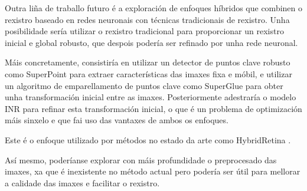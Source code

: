 Outra liña de traballo futuro é a exploración de enfoques híbridos que combinen o rexistro baseado en redes neuronais con técnicas tradicionais de rexistro.
Unha posibilidade sería utilizar o rexistro tradicional para proporcionar un rexistro inicial e global robusto, que despois podería ser refinado por unha rede neuronal.

Máis concretamente, consistiría en utilizar un detector de puntos clave robusto como SuperPoint \cite{superpoint} para extraer características das imaxes fixa e móbil, e utilizar un algoritmo de emparellamento de puntos clave como SuperGlue \cite{superglue} para obter unha transformación inicial entre as imaxes.
Posteriormente adestraría o modelo INR para refinar esta transformación inicial, o que é un problema de optimización máis sinxelo e que fai uso das vantaxes de ambos os enfoques.

Este é o enfoque utilizado por métodos no estado da arte como HybridRetina \cite{liu2024progressiveretinalimageregistration}. 

Así mesmo, poderíanse explorar con máis profundidade o preprocesado das imaxes, xa que é inexistente no método actual pero podería ser útil para mellorar a calidade das imaxes e facilitar o rexistro.